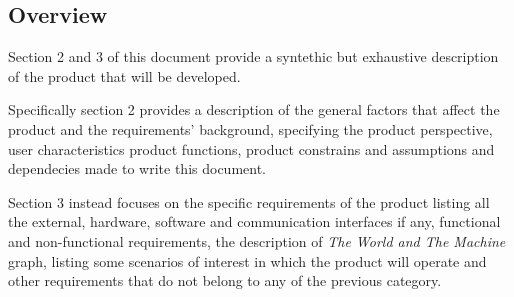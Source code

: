 	\subsection{Overview}
		Section 2 and 3 of this document provide a syntethic but exhaustive description of the product that will be developed.
				
		Specifically section 2 provides a description of the general factors that affect the product and the requirements' background, specifying the product perspective, user characteristics product functions, product constrains and assumptions and dependecies made to write this document.
		
		Section 3 instead focuses on the specific requirements of the product listing all the external, hardware, software and communication interfaces if any, functional and non-functional requirements, the description of \emph{The World and The Machine} graph, listing some scenarios of interest in which the product will operate and other requirements that do not belong to any of the previous category. 
	
	
